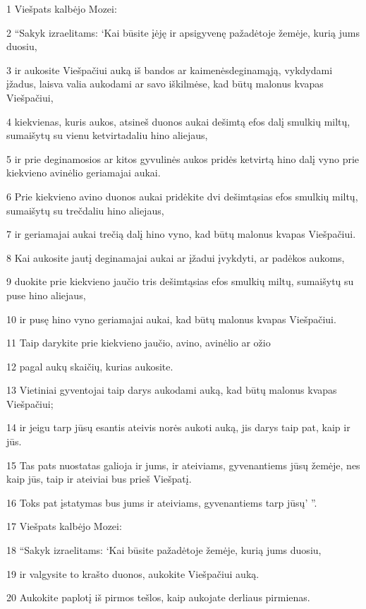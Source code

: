 \par 1 Viešpats kalbėjo Mozei: 
\par 2 “Sakyk izraelitams: ‘Kai būsite įėję ir apsigyvenę pažadėtoje žemėje, kurią jums duosiu, 
\par 3 ir aukosite Viešpačiui auką iš bandos ar kaimenės­deginamąją, vykdydami įžadus, laisva valia aukodami ar savo iškilmėse, kad būtų malonus kvapas Viešpačiui, 
\par 4 kiekvienas, kuris aukos, atsineš duonos aukai dešimtą efos dalį smulkių miltų, sumaišytų su vienu ketvirtadaliu hino aliejaus, 
\par 5 ir prie deginamosios ar kitos gyvulinės aukos pridės ketvirtą hino dalį vyno prie kiekvieno avinėlio geriamajai aukai. 
\par 6 Prie kiekvieno avino duonos aukai pridėkite dvi dešimtąsias efos smulkių miltų, sumaišytų su trečdaliu hino aliejaus, 
\par 7 ir geriamajai aukai trečią dalį hino vyno, kad būtų malonus kvapas Viešpačiui. 
\par 8 Kai aukosite jautį deginamajai aukai ar įžadui įvykdyti, ar padėkos aukoms, 
\par 9 duokite prie kiekvieno jaučio tris dešimtąsias efos smulkių miltų, sumaišytų su puse hino aliejaus, 
\par 10 ir pusę hino vyno geriamajai aukai, kad būtų malonus kvapas Viešpačiui. 
\par 11 Taip darykite prie kiekvieno jaučio, avino, avinėlio ar ožio 
\par 12 pagal aukų skaičių, kurias aukosite. 
\par 13 Vietiniai gyventojai taip darys aukodami auką, kad būtų malonus kvapas Viešpačiui; 
\par 14 ir jeigu tarp jūsų esantis ateivis norės aukoti auką, jis darys taip pat, kaip ir jūs. 
\par 15 Tas pats nuostatas galioja ir jums, ir ateiviams, gyvenantiems jūsų žemėje, nes kaip jūs, taip ir ateiviai bus prieš Viešpatį. 
\par 16 Toks pat įstatymas bus jums ir ateiviams, gyvenantiems tarp jūsų’ ”. 
\par 17 Viešpats kalbėjo Mozei: 
\par 18 “Sakyk izraelitams: ‘Kai būsite pažadėtoje žemėje, kurią jums duosiu, 
\par 19 ir valgysite to krašto duonos, aukokite Viešpačiui auką. 
\par 20 Aukokite paplotį iš pirmos tešlos, kaip aukojate derliaus pirmienas. 
